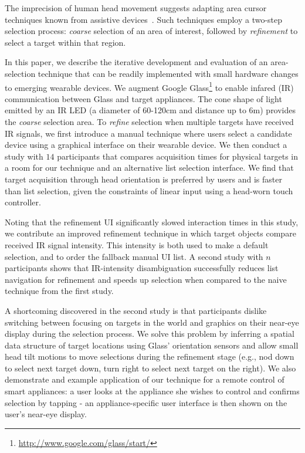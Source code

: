 The imprecision of human head movement suggests adapting area cursor techniques known from assistive devices~\cite{kabbash1995prince,worden1997making,findlater2010enhanced}. Such techniques employ a two-step selection process: {\em coarse} selection of an area of interest, followed by {\em refinement} to select a target within that region.

In this paper, we describe the iterative development and evaluation of an area-selection technique that can be readily implemented with small hardware changes to emerging wearable devices. We augment Google Glass\footnote{\url{http://www.google.com/glass/start/}} to enable infared (IR) communication between Glass and target appliances. The cone shape of light emitted by an IR LED (a diameter of 60-120cm and distance up to 6m) provides the {\em coarse} selection area. To {\em refine} selection when multiple targets have received IR signals, we first introduce a manual technique where users select a candidate device using a graphical interface on their wearable device.  We then conduct a study with $14$ participants that compares acquisition times for physical targets in a room for our technique and an alternative list selection interface. We find that target acquisition through head orientation is preferred by users and is faster than list selection, given the constraints of linear input using a head-worn touch controller. 

Noting that the refinement UI significantly slowed interaction times in this study, we contribute an improved refinement technique in which target objects compare received IR signal intensity. This intensity is both used to make a default selection, and to order the fallback manual UI list. A second study with $n$ participants shows that IR-intensity disambiguation successfully reduces list navigation for refinement and speeds up selection when compared to the naive technique from the first study.

A shortcoming discovered in the second study is that participants dislike switching between focusing on targets in the world and graphics on their near-eye display during the selection process. We solve this problem by inferring a spatial data structure of target locations using Glass' orientation sensors and allow small head tilt motions to move selections during the refinement stage (e.g., nod down to select next target down, turn right to select next target on the right).
We also demonstrate and example application of our technique for a remote control of smart appliances: a user looks at the appliance she wishes to control and confirms selection by tapping - an appliance-specific user interface is then shown on the user's near-eye display.

